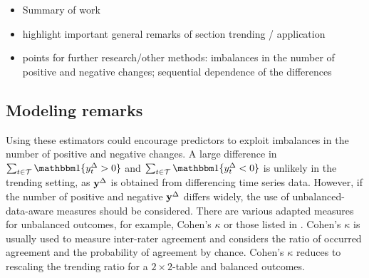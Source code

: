 

\begin{itemize}
  \item Summary of work
  \item highlight important general remarks of section trending / application
  \item points for further research/other methods: imbalances in the number of positive and negative changes; sequential dependence of the differences
\end{itemize}



\subsection{Modeling remarks}



Using these estimators could encourage predictors to exploit imbalances in the number of positive and negative changes. 
A large difference in $\sum_{t \in \mathcal{T}} \ind{\diffyt > 0}$ and $\sum_{t \in \mathcal{T}} \ind{\diffyt < 0}$ is unlikely in the trending setting, as $\mathbf{y}^{\Delta}$ is obtained from differencing time series data. 
However, if the number of positive and negative $\mathbf{y}^{\Delta}$ differs widely, the use of unbalanced-data-aware measures should be considered.
There are various adapted measures for unbalanced outcomes, for example, Cohen's $\kappa$ \parencite{Cohen1960} or those listed in \textcite[Table 3.3]{Jolliffe2012}.
Cohen's $\kappa$ is usually used to measure inter-rater agreement and considers the ratio of occurred agreement and the probability of agreement by chance.
Cohen's $\kappa$ reduces to rescaling the trending ratio for a $2\times2$-table and balanced outcomes.

